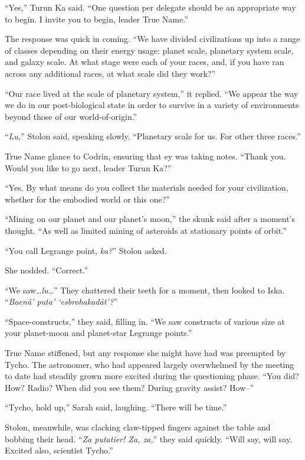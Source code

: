 ``Yes,'' Turun Ka said. ``One question per delegate should be an appropriate way to begin. I invite you to begin, leader True Name.''

The response was quick in coming. ``We have divided civilizations up into a range of classes depending on their energy usage: planet scale, planetary system scale, and galaxy scale. At what stage were each of your races, and, if you have ran across any additional races, at what scale did they work?''

``Our race lived at the scale of planetary system,'' it replied. ``We appear the way we do in our post-biological state in order to survive in a variety of environments beyond those of our world-of-origin.''

``\emph{Lu,}'' Stolon said, speaking slowly. ``Planetary scale for us. For other three races.''

True Name glance to Codrin, ensuring that ey was taking notes. ``Thank you. Would you like to go next, leader Turun Ka?''

``Yes. By what means do you collect the materials needed for your civilization, whether for the embodied world or this one?''

``Mining on our planet and our planet's moon,'' the skunk said after a moment's thought. ``As well as limited mining of asteroids at stationary points of orbit.''

``You call Legrange point, \emph{ka?}'' Stolon asked.

She nodded. ``Correct.''

``We saw\ldots{}\emph{lu\ldots{}}'' They chattered their teeth for a moment, then looked to Iska. ``\emph{Baenå' puta' `esbrohakadåt'?}''

``Space-constructs,'' they said, filling in. ``We saw constructs of various size at your planet-moon and planet-star Legrange points.''

True Name stiffened, but any response she might have had was preempted by Tycho. The astronomer, who had appeared largely overwhelmed by the meeting to date had steadily grown more excited during the questioning phase. ``You did? How? Radio? When did you see them? During gravity assist? How--''

``Tycho, hold up,'' Sarah said, laughing. ``There will be time.''

Stolon, meanwhile, was clacking claw-tipped fingers against the table and bobbing their head. ``\emph{Za putatier! Za, za,}'' they said quickly. ``Will say, will say. Excited also, scientist Tycho.''

